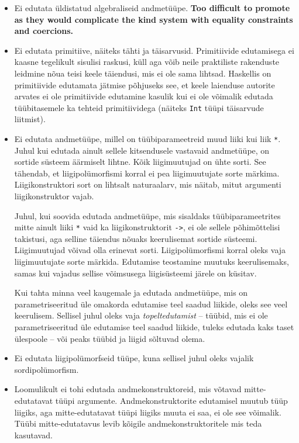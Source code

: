 \documentclass[12pt]{article}
\newcommand\markus[1]{\textcolor{roheline}{\textbf{#1}}}
\begin{document}
        \begin{itemize}
          \item
            Ei edutata üldistatud algebraliseid andmetüüpe. \markus{Too difficult to promote as they would complicate the kind system with equality constraints and coercions.}
          \item
            Ei edutata primitiive, näiteks tähti ja täisarvusid. Primitiivide edutamisega ei kaasne tegelikult sisulisi raskusi, küll aga võib neile praktiliste rakenduste leidmine nõua teisi keele täiendusi, mis ei ole sama lihtsad. Haskellis on primitiivide edutamata jätmise põhjuseks see, et keele laienduse autorite arvates ei ole primitiivide edutamine kasulik kui ei ole võimalik edutada tüübitasemele ka tehteid primitiividega (näiteks \verb!Int! tüüpi täisarvude liitmist).
          \item
            Ei edutata andmetüüpe, millel on tüübiparameetreid muud liiki kui liik \verb!*!. Juhul kui edutada ainult sellele kitsendusele vastavaid andmetüüpe, on sortide süsteem äärmiselt lihtne. Kõik liigimuutujad on ühte sorti. See tähendab, et liigipolümorfismi korral ei pea liigimuutujate sorte märkima. Liigikonstruktori sort on lihtsalt naturaalarv, mis näitab, mitut argumenti liigikonstruktor vajab.

            Juhul, kui soovida edutada andmetüüpe, mis sisaldaks tüübiparameetrites mitte ainult liiki \verb!*! vaid ka liigikonstruktorit \verb!->!, ei ole sellele põhimõttelisi takistusi, aga selline täiendus nõuaks keerulisemat sortide süsteemi. Liigimuutujad võivad olla erinevat sorti. Liigipolümorfismi korral oleks vaja liigimuutujate sorte märkida. Edutamise teostamine muutuks keerulisemaks, samas kui vajadus sellise võimsusega liigisüsteemi järele on küsitav.

            Kui tahta minna veel kaugemale ja edutada andmetüüpe, mis on parametriseeritud üle omakorda edutamise teel saadud liikide, oleks see veel keerulisem. Sellisel juhul oleks vaja \textit{topeltedutamist} -- tüübid, mis ei ole parametriseeritud üle edutamise teel saadud liikide, tuleks edutada kaks taset ülespoole -- või peaks tüübid ja liigid sõltuvad olema.
          \item
            Ei edutata liigipolümorfseid tüüpe, kuna sellisel juhul oleks vajalik sordipolümorfism.
          \item
            Loomulikult ei tohi edutada andmekonstruktoreid, mis võtavad mitte-edutatavat tüüpi argumente. Andmekonstruktorite edutamisel muutub tüüp liigiks, aga mitte-edutatavat tüüpi liigiks muuta ei saa, ei ole see võimalik. Tüübi mitte-edutatavus levib kõigile andmekonstruktoritele mis teda kasutavad.
        \end{itemize}
\end{document}
